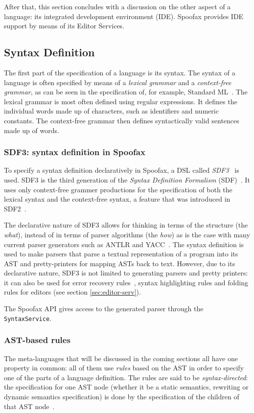 After that, this section concludes with a discussion on the other
aspect of a language: its integrated development environment
(IDE). Spoofax provides IDE support by means of its Editor Services.
\subsection{Syntax Definition}
\label{sec:syntax-def}
The first part of the specification of a language is its syntax. The
syntax of a language is often specified by means of a \emph{lexical
grammar} and a \emph{context-free grammar}, as can be seen in the
specification of, for example, Standard ML~\cite{Milner97}. The
lexical grammar is most often defined using regular expressions. It
defines the individual words made up of characters, such as
identifiers and numeric constants. The context-free grammar then
defines syntactically valid sentences made up of words.

\subsubsection{SDF3: syntax definition in Spoofax}
\label{sec:orgheadline1}
To specify a syntax definition declaratively in Spoofax, a DSL called
\emph{SDF3}~\cite{Vollebregt12} is used.  SDF3 is the third generation
of the \emph{Syntax Definition Formalism} (SDF)~\cite{Heering89}. It
uses only context-free grammer productions for the specification of
both the lexical syntax and the context-free syntax, a feature that
was introduced in SDF2~\cite{Visser97}.

The declarative nature of SDF3 allows for thinking in terms of the
structure (the \emph{what}), instead of in terms of parser algorithms (the
\emph{how}) as is the case with many current parser generators such as
ANTLR and YACC~\cite{Kats10b}. The syntax definition is used to
make parsers that parse a textual representation of a program into its
AST and pretty-printers for mapping ASTs back to text. However, due to
its declarative nature, SDF3 is not limited to generating parsers and
pretty printers: it can also be used for error recovery
rules~\cite{deJonge12}, syntax highlighting rules and folding
rules for editors (see section \ref{sec:editor-serv}).

The Spoofax API gives access to the generated parser through the
\texttt{SyntaxService}.
\subsubsection{AST-based rules}
\label{sec:orgheadline2}
The meta-languages that will be discussed in the coming sections all
have one property in common: all of them use \emph{rules} based on the AST
in order to specify one of the parts of a language definition. The
rules are said to be \emph{syntax-directed}: the specification for one AST
node (whether it be a static semantics, rewriting or dynamic semantics
specification) is done by the specification of the children of that
AST node~\cite{Winskel93}.
